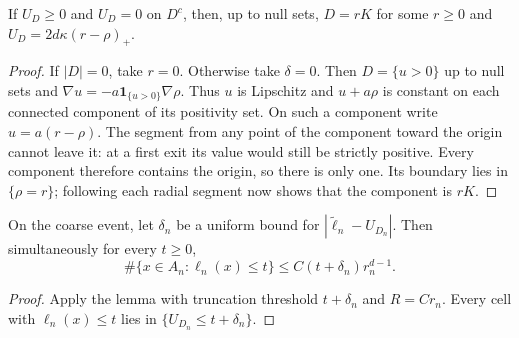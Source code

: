 \begin{corollary}\label{cor:calibration-rigidity}
If $U_D\geq0$ and $U_D=0$ on $D^c$, then, up to null sets, $D=rK$ for
some $r\geq0$ and $U_D=2d\kappa(r-\rho)_+$.
\end{corollary}
\begin{proof}
If $|D|=0$, take $r=0$. Otherwise take $\delta=0$. Then $D=\{u>0\}$ up to null sets and
$\nabla u=-a\mathbf1_{\{u>0\}}\nabla\rho$.
Thus $u$ is Lipschitz and $u+a\rho$ is constant on each connected
component of its positivity set. On such a component write
$u=a(r-\rho)$. The segment from any point of the component toward the
origin cannot leave it: at a first exit its value would still be
strictly positive. Every component therefore contains the origin, so
there is only one. Its boundary lies in $\{\rho=r\}$; following each
radial segment now shows that the component is $rK$.
\end{proof}

\begin{corollary}\label{cor:low-occupation}
On the coarse event, let $\delta_n$ be a uniform bound for
$|\widetilde\ell_n-U_{D_n}|$. Then simultaneously for every $t\geq0$,
\[
 \#\{x\in A_n:\ell_n(x)\leq t\}
 \leq C(t+\delta_n)r_n^{d-1}.
\]
\end{corollary}
\begin{proof}
Apply the lemma with truncation threshold $t+\delta_n$ and $R=Cr_n$.
Every cell with $\ell_n(x)\leq t$ lies in $\{U_{D_n}\leq t+\delta_n\}$.
\end{proof}
